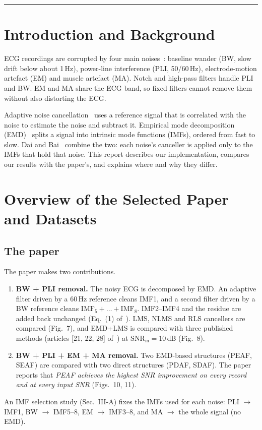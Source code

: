 \documentclass[11pt,a4paper]{article}
\newcommand{\imf}[1]{\mathrm{IMF}_{#1}}
\newcommand{\snrin}{\mathrm{SNR}_\mathrm{in}}
\begin{document}
{\small\setlength{\parskip}{0pt}\tableofcontents}
\vspace{4mm}\hrule\vspace{2mm}

\section{Introduction and Background}

ECG recordings are corrupted by four main noises~\cite{moody_nst}: baseline wander (BW, slow drift below about
1\,Hz), power-line interference (PLI, 50/60\,Hz), electrode-motion artefact (EM) and muscle artefact (MA). Notch
and high-pass filters handle PLI and BW. EM and MA share the ECG band, so fixed filters cannot remove them without
also distorting the ECG.

Adaptive noise cancellation~\cite{haykin} uses a reference signal that is correlated with the noise to estimate the
noise and subtract it. Empirical mode decomposition (EMD)~\cite{huang} splits a signal into intrinsic mode functions
(IMFs), ordered from fast to slow. Dai and Bai~\cite{dai} combine the two: each noise's canceller is applied only to
the IMFs that hold that noise. This report describes our implementation, compares our results with the paper's, and
explains where and why they differ.

\section{Overview of the Selected Paper and Datasets}

\subsection{The paper}
The paper makes two contributions.
\begin{enumerate}
  \item \textbf{BW + PLI removal.} The noisy ECG is decomposed by EMD. An adaptive filter driven by a 60\,Hz reference
        cleans IMF1, and a second filter driven by a BW reference cleans $\imf{5}+\dots+\imf{8}$. IMF2--IMF4 and the
        residue are added back unchanged (Eq.~(1) of~\cite{dai}). LMS, NLMS and RLS cancellers are compared (Fig.~7),
        and EMD+LMS is compared with three published methods (articles [21, 22, 28] of~\cite{dai}) at $\snrin=10$\,dB (Fig.~8).
  \item \textbf{BW + PLI + EM + MA removal.} Two EMD-based structures (PEAF, SEAF) are compared with two direct
        structures (PDAF, SDAF). The paper reports that \emph{PEAF achieves the highest SNR improvement on every
        record and at every input SNR} (Figs.~10, 11).
\end{enumerate}
An IMF selection study (Sec.~III-A) fixes the IMFs used for each noise: PLI $\to$ IMF1, BW $\to$ IMF5--8,
EM $\to$ IMF3--8, and MA $\to$ the whole signal (no EMD).
\end{document}
